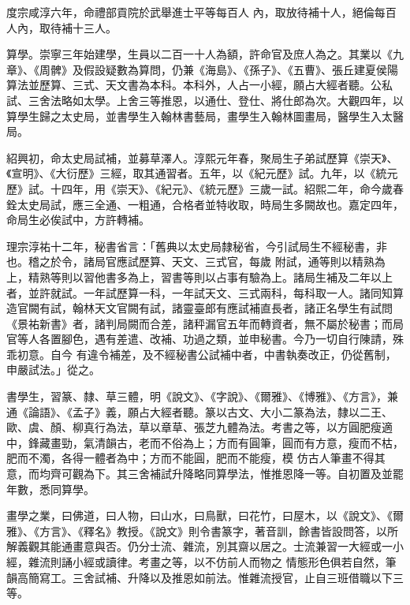 \begin{pinyinscope}
 度宗咸淳六年，命禮部貢院於武舉進士平等每百人
 內，取放待補十人，絕倫每百人內，取待補十三人。



 算學。崇寧三年始建學，生員以二百一十人為額，許命官及庶人為之。其業以《九章》、《周髀》及假設疑數為算問，仍兼《海島》、《孫子》、《五曹》、張丘建夏侯陽算法並歷算、三式、天文書為本科。本科外，人占一小經，願占大經者聽。公私試、三舍法略如太學。上舍三等推恩，以通仕、登仕、將仕郎為次。大觀四年，以算學生歸之太史局，並書學生入翰林書藝局，畫學生入翰林圖畫局，醫學生入太醫局。



 紹興初，命太史局試補，並募草澤人。淳熙元年春，聚局生子弟試歷算《崇天》、《宣明》、《大衍歷》三經，取其通習者。五年，以《紀元歷》試。九年，以《統元歷》試。十四年，用《崇天》、《紀元》、《統元歷》三歲一試。紹熙二年，命今歲春銓太史局試，應三全通、一粗通，合格者並特收取，時局生多闕故也。嘉定四年，命局生必俟試中，方許轉補。



 理宗淳祐十二年，秘書省言：「舊典以太史局隸秘省，今引試局生不經秘書，非也。稽之於令，諸局官應試歷算、天文、三式官，每歲
 附試，通等則以精熟為上，精熟等則以習他書多為上，習書等則以占事有驗為上。諸局生補及二年以上者，並許就試。一年試歷算一科，一年試天文、三式兩科，每科取一人。諸同知算造官闕有試，翰林天文官闕有試，諸靈臺郎有應試補直長者，諸正名學生有試問《景祐新書》者，諸判局闕而合差，諸秤漏官五年而轉資者，無不屬於秘書；而局官等人各置腳色，遇有差遣、改補、功過之類，並申秘書。今乃一切自行陳請，殊乖初意。自今
 有違令補差，及不經秘書公試補中者，中書執奏改正，仍從舊制，申嚴試法。」從之。



 書學生，習篆、隸、草三體，明《說文》、《字說》、《爾雅》、《博雅》、《方言》，兼通《論語》、《孟子》義，願占大經者聽。篆以古文、大小二篆為法，隸以二王、歐、虞、顏、柳真行為法，草以章草、張芝九體為法。考書之等，以方圓肥瘦適中，鋒藏畫勁，氣清韻古，老而不俗為上；方而有圓筆，圓而有方意，瘦而不枯，肥而不濁，各得一體者為中；方而不能圓，肥而不能瘦，模
 仿古人筆畫不得其意，而均齊可觀為下。其三舍補試升降略同算學法，惟推恩降一等。自初置及並罷年數，悉同算學。



 畫學之業，曰佛道，曰人物，曰山水，曰鳥獸，曰花竹，曰屋木，以《說文》、《爾雅》、《方言》、《釋名》教授。《說文》則令書篆字，著音訓，餘書皆設問答，以所解義觀其能通畫意與否。仍分士流、雜流，別其齋以居之。士流兼習一大經或一小經，雜流則誦小經或讀律。考畫之等，以不仿前人而物之
 情態形色俱若自然，筆韻高簡寫工。三舍試補、升降以及推恩如前法。惟雜流授官，止自三班借職以下三等。




\end{pinyinscope}
